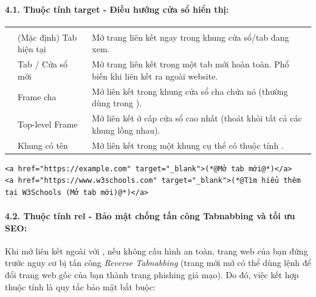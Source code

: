 \paragraph{4.1. Thuộc tính target - Điều hướng cửa sổ hiển thị:}

\begin{prettyTableBox}
\begin{tabularx}{\linewidth}{C{2.5cm} L{3.5cm} Z}
 &  &  \\
 & (Mặc định) Tab hiện tại & Mở trang liên kết ngay trong khung cửa sổ/tab đang xem. \\
 & Tab / Cửa sổ mới & Mở trang liên kết trong một tab mới hoàn toàn. Phổ biến khi liên kết ra ngoài website. \\
 & Frame cha & Mở liên kết trong khung cửa sổ cha chứa nó (thường dùng trong ). \\
 & Top-level Frame & Mở liên kết ở cấp cửa sổ cao nhất (thoát khỏi tất cả các khung lồng nhau). \\
 & Khung có tên & Mở liên kết trong một khung cụ thể có thuộc tính . \\
\end{tabularx}
\end{prettyTableBox}

\begin{codeWindow}[Mã Nguồn Mở Trang Web Trong Tab Mới Bằng target="\_blank"]
\begin{lstlisting}[language=HTML5]
<a href="https://example.com" target="_blank">(*@Mở tab mới@*)</a>
<a href="https://www.w3schools.com" target="_blank">(*@Tìm hiểu thêm tại W3Schools (Mở tab mới)@*)</a>
\end{lstlisting}
\end{codeWindow}

\paragraph{4.2. Thuộc tính rel - Bảo mật chống tấn công Tabnabbing và tối ưu SEO:}
Khi mở liên kết ngoài với , nếu không cấu hình an toàn, trang web của bạn đứng trước nguy cơ bị tấn công \textit{Reverse Tabnabbing} (trang mới mở có thể dùng lệnh  để đổi trang web gốc của bạn thành trang phishing giả mạo). Do đó, việc kết hợp thuộc tính  là quy tắc bảo mật bắt buộc:

